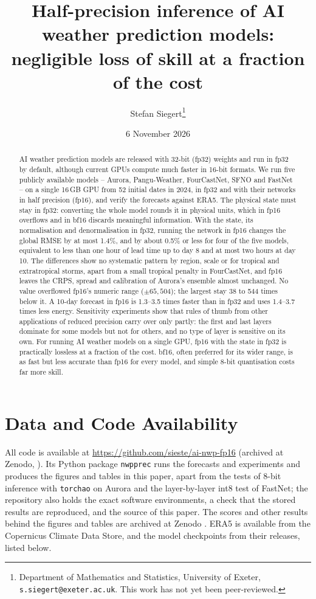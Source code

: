\documentclass[11pt]{article}
\title{Half-precision inference of AI weather prediction models: negligible loss of skill at a fraction of the cost}
\author{Stefan Siegert\footnote{Department of Mathematics and Statistics, University of Exeter, \texttt{s.siegert@exeter.ac.uk}. This work has not yet been peer-reviewed.}}
\date{6 November 2026}
\begin{document}
\maketitle


\begin{abstract}
AI weather prediction models are released with 32-bit (fp32)
weights and run in fp32 by default, although current GPUs compute much
faster in 16-bit formats. We run five publicly available models --
Aurora, Pangu-Weather, FourCastNet, SFNO and FastNet -- on a single
16\,GB GPU from 52 initial dates in 2024, in fp32 and with their networks
in half precision (fp16), and verify the forecasts against ERA5. The
physical state must stay in fp32: converting the whole model rounds it
in physical units, which in fp16 overflows and in bf16 discards
meaningful information. With the state, its normalisation and
denormalisation in fp32, running the network in fp16 changes the global
RMSE by at most 1.4\%, and by about 0.5\% or less for four of the five
models, equivalent to less than one hour of lead time up to day 8 and at
most two hours at day 10. The differences show no systematic pattern by
region, scale or for tropical and extratropical storms, apart from a
small tropical penalty in FourCastNet, and fp16 leaves the CRPS, spread
and calibration of Aurora's ensemble almost unchanged. No value
overflowed fp16's numeric range ($\pm65{,}504$); the largest stay 38 to 544 times below it. A
10-day forecast in fp16 is 1.3--3.5 times faster than in fp32 and uses
1.4--3.7 times less energy. Sensitivity experiments show that rules of
thumb from other applications of reduced precision carry over only
partly: the first and last layers dominate for some models but not for
others, and no type of layer is sensitive on its own. For running AI
weather models on a single GPU, fp16 with the state in fp32 is
practically lossless at a fraction of the cost. bf16, often preferred for
its wider range, is as fast but less accurate than fp16 for every model,
and simple 8-bit quantisation costs far more skill.
\end{abstract}








\section*{Data and Code Availability}
All code is available at \url{https://github.com/sieste/ai-nwp-fp16}
(archived at Zenodo, \citealp{siegert2026code}). Its Python package \texttt{nwpprec} runs
the forecasts and experiments and produces the figures and tables in this
paper, apart from the tests of 8-bit inference with \texttt{torchao} on Aurora
and the layer-by-layer int8 test of FastNet; the
repository also holds the exact software environments, a check that the
stored results are reproduced, and the source of this paper. The scores
and other results behind the figures and tables are archived at Zenodo
\citep{siegert2026data}. ERA5 is available from the Copernicus Climate Data
Store, and the model checkpoints from their releases, listed below.
\end{document}
